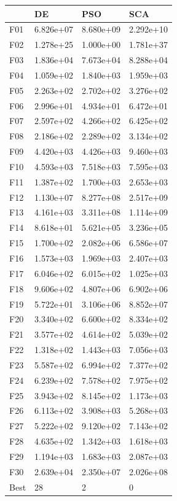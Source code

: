 \begin{tabular}{llll}
\toprule
{} &         DE &        PSO &        SCA \\
\midrule
F01  &  6.826e+07 &  8.680e+09 &  2.292e+10 \\
F02  &  1.278e+25 &  1.000e+00 &  1.781e+37 \\
F03  &  1.836e+04 &  7.673e+04 &  8.288e+04 \\
F04  &  1.059e+02 &  1.840e+03 &  1.959e+03 \\
F05  &  2.263e+02 &  2.702e+02 &  3.276e+02 \\
F06  &  2.996e+01 &  4.934e+01 &  6.472e+01 \\
F07  &  2.597e+02 &  4.266e+02 &  6.425e+02 \\
F08  &  2.186e+02 &  2.289e+02 &  3.134e+02 \\
F09  &  4.420e+03 &  4.426e+03 &  9.460e+03 \\
F10  &  4.593e+03 &  7.518e+03 &  7.595e+03 \\
F11  &  1.387e+02 &  1.700e+03 &  2.653e+03 \\
F12  &  1.130e+07 &  8.277e+08 &  2.517e+09 \\
F13  &  4.161e+03 &  3.311e+08 &  1.114e+09 \\
F14  &  8.618e+01 &  5.621e+05 &  3.236e+05 \\
F15  &  1.700e+02 &  2.082e+06 &  6.586e+07 \\
F16  &  1.573e+03 &  1.969e+03 &  2.407e+03 \\
F17  &  6.046e+02 &  6.015e+02 &  1.025e+03 \\
F18  &  9.606e+02 &  4.807e+06 &  6.902e+06 \\
F19  &  5.722e+01 &  3.106e+06 &  8.852e+07 \\
F20  &  3.340e+02 &  6.600e+02 &  8.334e+02 \\
F21  &  3.577e+02 &  4.614e+02 &  5.039e+02 \\
F22  &  1.318e+02 &  1.443e+03 &  7.056e+03 \\
F23  &  5.587e+02 &  6.994e+02 &  7.377e+02 \\
F24  &  6.239e+02 &  7.578e+02 &  7.975e+02 \\
F25  &  3.943e+02 &  8.145e+02 &  1.173e+03 \\
F26  &  6.113e+02 &  3.908e+03 &  5.268e+03 \\
F27  &  5.222e+02 &  9.120e+02 &  7.143e+02 \\
F28  &  4.635e+02 &  1.342e+03 &  1.618e+03 \\
F29  &  1.194e+03 &  1.683e+03 &  2.087e+03 \\
F30  &  2.639e+04 &  2.350e+07 &  2.026e+08 \\
Best &         28 &          2 &          0 \\
\bottomrule
\end{tabular}
